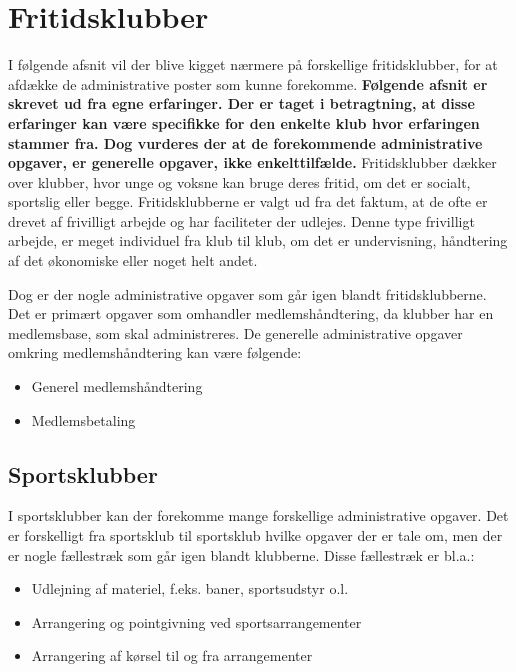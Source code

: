 \chapter{Fritidsklubber} \label{chap:Fritidsklubber}

I følgende afsnit vil der blive kigget nærmere på forskellige fritidsklubber, for at afdække de administrative
poster som kunne forekomme. \textbf{Følgende afsnit er skrevet ud fra egne erfaringer. Der er taget i betragtning, at disse erfaringer kan være specifikke for den enkelte klub hvor erfaringen stammer fra. Dog vurderes der at de forekommende administrative opgaver, er generelle opgaver, ikke enkelttilfælde.}
Fritidsklubber dækker over klubber, hvor unge og voksne kan bruge deres fritid, om
det er socialt, sportslig eller begge. Fritidsklubberne er valgt ud fra det faktum, at de ofte er drevet af frivilligt
arbejde og har faciliteter der udlejes. Denne type frivilligt arbejde, er meget individuel fra klub til klub, om det er undervisning, håndtering af det
økonomiske eller noget helt andet.

Dog er der nogle administrative opgaver som går igen blandt fritidsklubberne. Det er primært opgaver som omhandler medlemshåndtering, da klubber har en medlemsbase, som skal administreres. De generelle administrative opgaver omkring medlemshåndtering kan være følgende:
\begin{itemize}
	\item Generel medlemshåndtering
	\item Medlemsbetaling
\end{itemize}


\section{Sportsklubber} \label{Sportsklubber}

I sportsklubber kan der forekomme mange forskellige administrative opgaver. Det er forskelligt fra sportsklub til sportsklub hvilke opgaver der er tale om, men der er nogle fællestræk som går igen blandt klubberne. Disse fællestræk er bl.a.:
\begin{itemize}
	\item Udlejning af materiel, f.eks. baner, sportsudstyr o.l.
	\item Arrangering og pointgivning ved sportsarrangementer
	\item Arrangering af kørsel til og fra arrangementer
\end{itemize}

